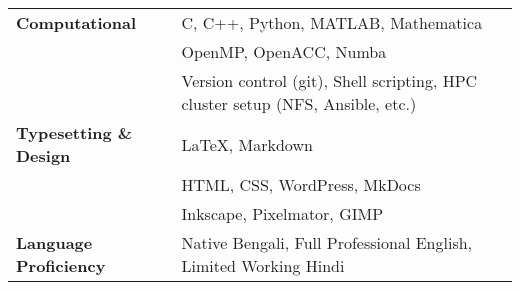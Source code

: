 \begin{longtable}[l]{@{} m{4.75cm} m{15cm}}
\textbf{Computational} & C, C++, Python, MATLAB, Mathematica\\
                                  & OpenMP, OpenACC, Numba\\
                                  & Version control (git), Shell scripting, HPC cluster setup (NFS, Ansible, etc.)\\[0.2cm]

\textbf{Typesetting \& Design} & \LaTeX, Markdown \\
                                                          & HTML, CSS, WordPress, MkDocs \\
                                                          & Inkscape, Pixelmator, GIMP\\[0.2cm]
                                                            
\textbf{Language Proficiency} & Native Bengali, Full Professional English,  Limited Working Hindi\\                                               
\end{longtable}